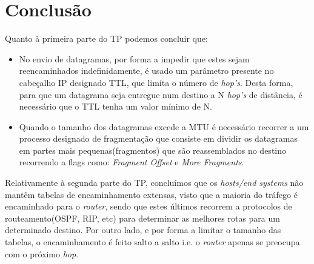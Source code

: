 \documentclass{exam}
\begin{document}
\section{Conclusão}
Quanto à primeira parte do TP podemos concluir que:
\begin{itemize}
	\item No envio de datagramas, por forma a impedir que estes sejam reencaminhados indefinidamente, 
	é usado um parâmetro presente no cabeçalho IP designado TTL, que limita o número de \textit{hop's}. 
	Desta forma, para que um datagrama seja entregue num destino a N \textit{hop's} de distância, 
	é necessário que o TTL tenha um valor mínimo de N.
	\item Quando o tamanho dos datagramas excede a MTU é necessário recorrer a um processo designado 
	de fragmentação que consiste em dividir os datagramas em partes mais pequenas(fragmentos) que são 
	reassemblados no destino recorrendo a flags como: \textit{Fragment Offset} e \textit{More Fragments}.
\end{itemize}

Relativamente à segunda parte do TP, concluímos que os \textit{hosts/end systems} não mantêm 
tabelas de encaminhamento extensas, visto que a maioria do tráfego é encaminhado para o 
\textit{router}, sendo que estes últimos recorrem a protocolos de routeamento(OSPF, RIP, etc) 
para determinar as melhores rotas para um determinado destino. Por outro lado, e por forma a 
limitar o tamanho das tabelas, o encaminhamento é feito salto a salto i.e. o \textit{router} 
apenas se preocupa com o próximo \textit{hop}.
\end{document}
